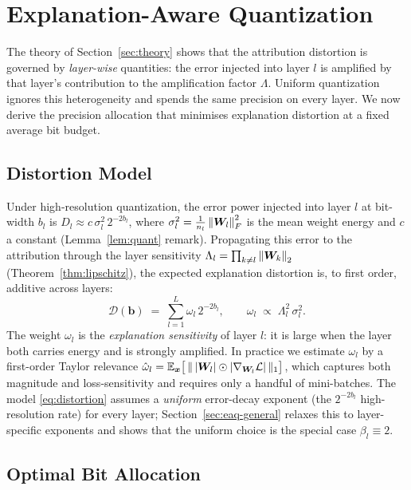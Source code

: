 \section{Explanation-Aware Quantization}
\label{sec:eaq}

The theory of Section~\ref{sec:theory} shows that the attribution distortion is
governed by \emph{layer-wise} quantities: the error injected into layer $l$ is
amplified by that layer's contribution to the amplification factor $\Lambda$.
Uniform quantization ignores this heterogeneity and spends the same precision on
every layer. We now derive the precision allocation that minimises explanation
distortion at a fixed average bit budget.

\subsection{Distortion Model}
Under high-resolution quantization, the error power injected into layer $l$ at
bit-width $b_l$ is $D_l\!\approx\! c\,\sigma_l^2\,2^{-2b_l}$, where
$\sigma_l^2=\tfrac1{n_l}\left\lVert\bm{W}_l\right\rVert_F^2$ is the mean weight energy and $c$ a
constant (Lemma~\ref{lem:quant} remark). Propagating this error to the
attribution through the layer sensitivity $\Lambda_l=\prod_{k\ne l}\left\lVert\bm{W}_k\right\rVert_2$
(Theorem~\ref{thm:lipschitz}), the expected explanation distortion is, to first
order, additive across layers:
\begin{equation}
\mathcal D(\bm b)\;=\;\sum_{l=1}^{L}\omega_l\,2^{-2b_l},\qquad
\omega_l\;\propto\;\Lambda_l^2\,\sigma_l^2 .
\label{eq:distortion}
\end{equation}
The weight $\omega_l$ is the \emph{explanation sensitivity} of layer $l$: it is
large when the layer both carries energy and is strongly amplified. In practice
we estimate $\omega_l$ by a first-order Taylor relevance
$\hat\omega_l=\mathbb{E}_{\bm{x}}\bigl[\,\lVert\,|\bm{W}_l|\odot|\nabla_{\bm{W}_l}\mathcal L|\,
\rVert_1\bigr]$, which captures both magnitude and loss-sensitivity and requires
only a handful of mini-batches. The model \eqref{eq:distortion} assumes a
\emph{uniform} error-decay exponent (the $2^{-2b_l}$ high-resolution rate) for
every layer; Section~\ref{sec:eaq-general} relaxes this to layer-specific
exponents and shows that the uniform choice is the special case $\beta_l\equiv2$.

\subsection{Optimal Bit Allocation}

